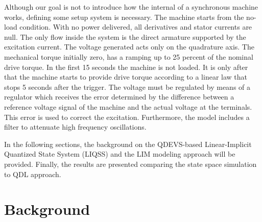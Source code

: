\documentclass{scspaperproc}
\theoremstyle{scsthe}
\begin{document}
Although our goal is not to introduce how the internal of a synchronous machine works, defining some setup system is necessary. The machine starts from the no-load condition. With no power delivered, all derivatives and stator currents are null. The only flow inside the system is the direct armature supported by the excitation current. The voltage generated acts only on the quadrature axis. The mechanical torque initially zero, has a ramping up to 25 percent of the nominal drive torque. In the first 15 seconds the machine is not loaded. It is only after that the machine starts to provide drive torque according to a linear law that stops 5 seconds after the trigger. The voltage must be regulated by means of a regulator which receives the error determined by the difference between a reference voltage signal of the machine and the actual voltage at the terminals. This error is used to correct the excitation. Furthermore, the model includes a filter to attenuate high frequency oscillations.

In the following sections, the background on the QDEVS-based Linear-Implicit Quantized State System (LIQSS) and the LIM modeling approach will be provided. Finally, the results are presented comparing the state space simulation to QDL approach. 

\section{Background}
\end{document}
